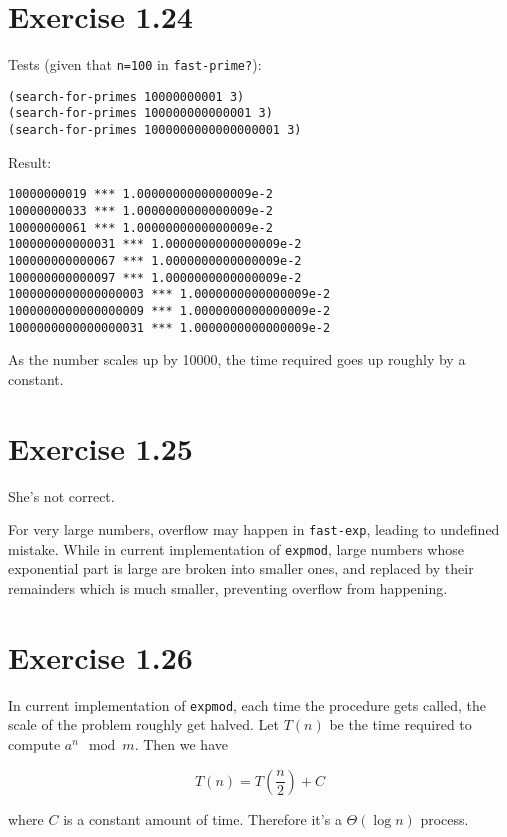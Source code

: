 \documentclass[../main.tex]{subfiles}
\begin{document}
\section{Exercise 1.24}

Tests (given that \lstinline{n=100} in \lstinline{fast-prime?}):

\begin{lstlisting}
(search-for-primes 10000000001 3)
(search-for-primes 100000000000001 3)
(search-for-primes 1000000000000000001 3)
\end{lstlisting}

Result:

\begin{lstlisting}
10000000019 *** 1.0000000000000009e-2
10000000033 *** 1.0000000000000009e-2
10000000061 *** 1.0000000000000009e-2
100000000000031 *** 1.0000000000000009e-2
100000000000067 *** 1.0000000000000009e-2
100000000000097 *** 1.0000000000000009e-2
1000000000000000003 *** 1.0000000000000009e-2
1000000000000000009 *** 1.0000000000000009e-2
1000000000000000031 *** 1.0000000000000009e-2
\end{lstlisting}

As the number scales up by 10000, the time required
 goes up roughly by a constant.

\section{Exercise 1.25}

She's not correct.

For very large numbers, overflow may happen in \lstinline{fast-exp}, leading to undefined mistake.
 While in current implementation of \lstinline{expmod}, large numbers whose exponential part is
 large are broken into smaller ones, and replaced by their remainders which is much smaller, preventing
 overflow from happening.

\section{Exercise 1.26}

In current implementation of \lstinline{expmod}, each time the procedure gets called, the scale of the
 problem roughly get halved. Let $T(n)$ be the time required to compute $a^n \mod m$. Then we have

$$
T(n) = T\left(\frac{n}{2}\right) + C
$$

where $C$ is a constant amount of time. Therefore it's a $\Theta(\log n)$ process.
\end{document}
